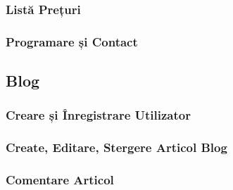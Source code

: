 \documentclass[11pt]{scrartcl} %
\begin{document}

\subsubsection{Listă Prețuri}


\subsubsection{Programare și Contact}




\subsection{Blog}


\subsubsection{Creare și Înregistrare Utilizator}


\subsubsection{Create, Editare, Stergere Articol Blog}


\subsubsection{Comentare Articol}

\end{document}
